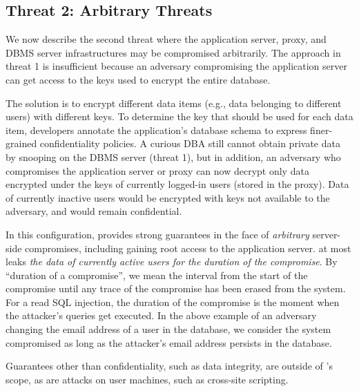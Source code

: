 
\subsection{Threat 2: Arbitrary Threats}
\label{ss:arbthreat}

We now describe the second threat where the application server, proxy,
and DBMS server infrastructures may be compromised arbitrarily.  The
approach in threat 1 is insufficient because an adversary compromising
the application server can get access to the keys used to encrypt the
entire database.

The solution is to encrypt different data items (e.g., data belonging to
different users) with different keys.  To determine the key that should
be used for each data item, developers annotate the application's
database schema to express finer-grained confidentiality policies.
A curious DBA still cannot obtain private data by snooping on the DBMS
server (threat 1), but in addition, an adversary who compromises the
application server or proxy can now decrypt only data encrypted under
the keys of currently logged-in users (stored in the \name{} proxy).
Data of currently inactive users would be encrypted with keys not
available to the adversary, and would remain confidential. 

In this configuration, \name{} provides strong guarantees in the face
of {\em arbitrary} server-side compromises, including gaining root
access to the application server. \name{} at most leaks \textit{the
  data of currently active users for the duration of the
  compromise}. By ``duration of a compromise'', we mean the interval
from the start of the compromise until any trace of the compromise has
been erased from the system.  For a read SQL injection, the duration of
the compromise is the moment when the attacker's queries get
executed. In the above example of an adversary changing the email
address of a user in the database, we consider the system compromised
as long as the attacker's email address persists in the database.

Guarantees other than confidentiality, such as data integrity, are
outside of \name's scope, as are attacks on user machines, such as
cross-site scripting.


